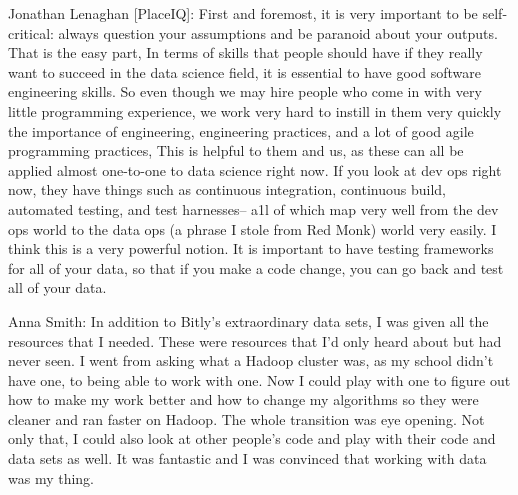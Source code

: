 Jonathan Lenaghan [PlaceIQ]: First and foremost, it is very important
to be self-critical: always question your assumptions
and be paranoid about your outputs. That is the easy
part, In terms of skills that people should have if they
really want to succeed in the data science field, it is
essential to have good software engineering skills. So
even though we may hire people who come in with
very little programming experience, we work very
hard to instill in them very quickly the importance of
engineering, engineering practices, and a lot of good
agile programming practices, This is helpful to them
and us, as these can all be applied almost one-to-one
to data science right now.
If you look at dev ops right now, they have things
such as continuous integration, continuous build,
automated testing, and test harnesses-- a1l of which
map very well from the dev ops world to the data ops
(a phrase I stole from Red Monk) world very easily. I
think this is a very powerful notion. It is important to
have testing frameworks for all of your data, so that if
you make a code change, you can go back and test all
of your data. %


Anna Smith: In addition to Bitly's extraordinary data sets,
I was given all the resources that I needed. These were
resources that I’d only heard about but had never
seen. I went from asking what a Hadoop cluster was,
as my school didn't have one, to being able to work
with one. Now I could play with one to figure out how
to make my work better and how to change my
algorithms so they were cleaner and ran faster on
Hadoop. The whole transition was eye opening. Not
only that, I could also look at other people’s code and
play with their code and data sets as well. It was
fantastic and I was convinced that working with data
was my thing.
